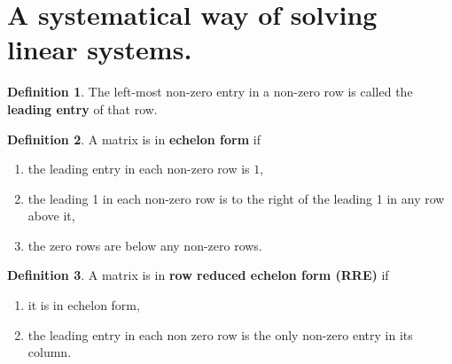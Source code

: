 \documentclass[11pt,a4paper]{article}
\theoremstyle{definition}
\newtheorem{definition}{Definition}
\begin{document}
\section{A systematical way of solving linear systems.}
\begin{definition}
    The left-most non-zero entry in a non-zero row is called the \textbf{leading entry} of that row.
\end{definition}

\begin{definition}
    A matrix is in \textbf{echelon form} if 
    \begin{enumerate}
        \item the leading entry in each non-zero row is $1$,
        \item the leading 1 in each non-zero row is to the right of the leading 1 in any row above it,
        \item the zero rows are below any non-zero rows. 
    \end{enumerate}
\end{definition}

\begin{definition}
    A matrix is in \textbf{row reduced echelon form (RRE)} if 
    \begin{enumerate}
        \item it is in echelon form,
        \item the leading entry in each non zero row is the only non-zero entry in its column.
    \end{enumerate}
\end{definition}
\end{document}
